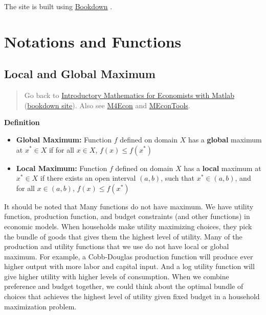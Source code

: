 \documentclass[
]{book}
\begin{document}
The site is built using \href{https://bookdown.org/}{Bookdown} \citep{R-bookdown}.

\hypertarget{notations-and-functions}{%
\chapter{Notations and Functions}\label{notations-and-functions}}

\hypertarget{local-and-global-maximum}{%
\section{Local and Global Maximum}\label{local-and-global-maximum}}

\begin{quote}
Go back to \href{https://math4econ.github.io/}{Introductory Mathematics for Economists with Matlab} (\href{https://math4econ.github.io/bookdown}{bookdown site}). Also see \href{http://fanwangecon.github.io/M4Econ}{M4Econ} and \href{https://fanwangecon.github.io/MEconTools/}{MEconTools}.
\end{quote}

\textbf{Definition}

\begin{itemize}
\item
  \textbf{Global Maximum:} Function \(f\) defined on domain \(X\) has a
  \textbf{global} maximum at \(x^* \in X\) if for all \(x\in X\),
  \(f(x)\le f(x^* )\)
\item
  \textbf{Local Maximum:} Function \(f\) defined on domain \(X\) has a
  \textbf{local} maximum at \(x^* \in X\) if there exists an open interval
  \(\left(a,b\right)\), such that \(x^* \in \left(a,b\right)\), and for
  all \(x\in \left(a,b\right)\), \(f(x)\le f(x^* )\)
\end{itemize}

It should be noted that Many functions do not have maximum. We have
utility function, production function, and budget constraints (and other
functions) in economic models. When households make utility maximizing
choices, they pick the bundle of goods that gives them the highest level
of utility. Many of the production and utility functions that we use do
not have local or global maximum. For example, a Cobb-Douglas production
function will produce ever higher output with more labor and capital
input. And a log utility function will give higher utility with higher
levels of consumption. When we combine preference and budget together,
we could think about the optimal bundle of choices that achieves the
highest level of utility given fixed budget in a household maximization
problem.
\end{document}
